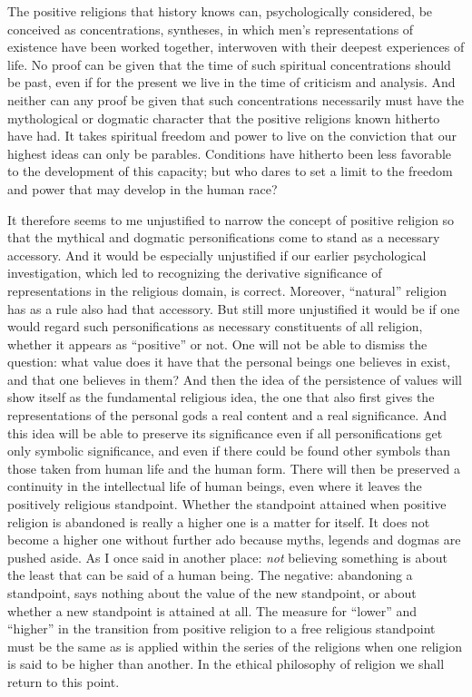 \documentclass[12pt,a4paper,openany]{book}
\newcommand{\opage}[1]{\marginnote{\footnotesize\textit{[#1]}}}
\begin{document}
The positive religions that history knows can, psychologically considered, be conceived as
concentrations, syntheses, in which men's representations of existence have been worked
together, interwoven with their deepest experiences of life. No proof can be given that
the time of such spiritual concentrations should be past, even if for the present we live
in the time of criticism and analysis. And neither can any proof be given that such
concentrations necessarily must have the mythological or dogmatic character that the
positive religions known hitherto have had. It
\setcounter{footnote}{0}%
\opage{239}takes spiritual freedom and power to live on the conviction that our highest ideas
can only be parables. Conditions have hitherto been less favorable to the development of
this capacity; but who dares to set a limit to the freedom and power that may develop in
the human race?


It therefore seems to me unjustified to narrow the concept of positive religion so that
the mythical and dogmatic personifications come to stand as a necessary accessory. And it
would be especially unjustified if our earlier psychological investigation, which led to
recognizing the derivative significance of representations in the religious domain, is
correct. Moreover, ``natural'' religion has as a rule also had that accessory. But still
more unjustified it would be if one would regard such personifications as necessary
constituents of all religion, whether it appears as ``positive'' or not. One will not be
able to dismiss the question: what value does it have that the personal beings one
believes in exist, and that one believes in them? And then the idea of the persistence of
values will show itself as the fundamental religious idea, the one that also first gives
the representations of the personal gods a real content and a real significance. And this
idea will be able to preserve its
significance even if all personifications get only symbolic significance, and even if
there could be found other symbols than those taken from human life and the human form.
There will then be preserved a continuity in the intellectual life of human beings, even
where it leaves the positively religious standpoint. Whether the standpoint attained when
positive religion is abandoned is really a higher one is a matter for itself. It does not
become a higher one without further ado because myths, legends and dogmas are pushed
aside. As I once said in another place: \textit{not} believing something is about the
least that can be said of a human being. The negative: abandoning a standpoint, says
nothing about the value of the new standpoint, or about whether
\setcounter{footnote}{0}%
\opage{240}a new standpoint is attained at all. The measure for ``lower'' and ``higher'' in the
transition from positive religion to a free religious standpoint must be the same as is
applied within the series of the religions when one religion is said to be higher than
another. In the ethical philosophy of religion we shall return to this point.
\end{document}
